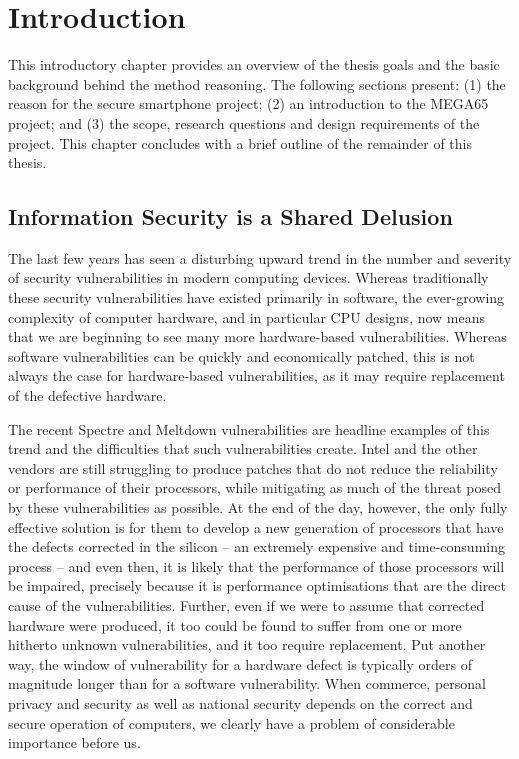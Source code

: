 
\chapter{Introduction} %

\label{Chapter1} %


This introductory chapter provides an overview of the thesis goals and the basic background behind the method reasoning. The following sections present: (1) the reason for the secure smartphone project; (2) an introduction to the MEGA65 project; and (3) the scope, research questions and design requirements of the project. This chapter concludes with a brief outline of the remainder of this thesis.

\section{Information Security is a Shared Delusion}

	The last few years has seen a disturbing upward trend in the number and severity of security vulnerabilities in modern computing devices. Whereas traditionally these security vulnerabilities have existed primarily in software, the ever-growing complexity of computer hardware, and in particular CPU designs, now means that we are beginning to see many more hardware-based vulnerabilities.  Whereas software vulnerabilities can be quickly and economically patched, this is not always the case for hardware-based vulnerabilities, as it may require replacement of the defective hardware.  

The recent Spectre  and Meltdown  vulnerabilities are headline examples of this trend and the difficulties that such vulnerabilities create. Intel and the other vendors are still struggling to produce patches that do not reduce the reliability or performance of their processors, while mitigating as much of the threat posed by these vulnerabilities as possible.  At the end of the day, however, the only fully effective solution is for them to develop a new generation of processors that have the defects corrected in the silicon – an extremely expensive and time-consuming process – and even then, it is likely that the performance of those processors will be impaired, precisely because it is performance optimisations that are the direct cause of the vulnerabilities.  Further, even if we were to assume that corrected hardware were produced, it too could be found to suffer from one or more hitherto unknown vulnerabilities, and it too require replacement.  Put another way, the window of vulnerability for a hardware defect is typically orders of magnitude longer than for a software vulnerability. When commerce, personal privacy and security as well as national security depends on the correct and secure operation of computers, we clearly have a problem of considerable importance before us.

